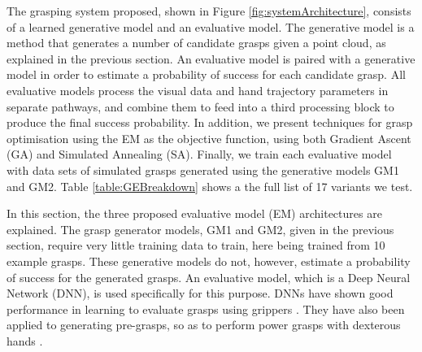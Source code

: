 \noindent
The grasping system proposed, shown in Figure \ref{fig:systemArchitecture}, consists of a learned generative model and an evaluative model. The generative model is a method that generates a number of candidate grasps given a point cloud, as explained in the previous section. An evaluative model is paired with a generative model in order to estimate a probability of success for each candidate grasp. All evaluative models process the visual data and hand trajectory parameters in separate pathways, and combine them to feed into a third processing block to produce the final success probability. In addition, we present techniques for grasp optimisation using the EM as the objective function, using both Gradient Ascent (GA) and Simulated Annealing (SA). Finally, we train each evaluative model with data sets of simulated grasps generated using the generative models GM1 and GM2. Table \ref{table:GEBreakdown} shows a the full list of 17 variants we test.

In this section, the three proposed evaluative model (EM) architectures are explained. The grasp generator models, GM1 and GM2, given in the previous section, require very little training data to train, here being trained from 10 example grasps. %
These generative models do not, however, estimate a probability of success for the generated grasps. An evaluative model, which is a Deep Neural Network (DNN), is used specifically for this purpose. DNNs have shown good performance in learning to evaluate grasps using grippers \cite{levine16,lenz2015deep}. They have also been applied to generating pre-grasps, so as to perform power grasps with dexterous hands \cite{varley2015generating,lu2017planning}.


